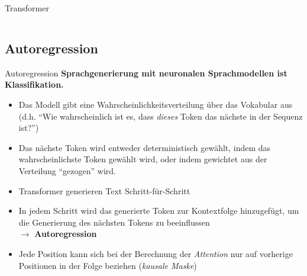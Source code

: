 \documentclass[aspectratio=169,10pt]{beamer}
\begin{document}
\begin{frame}{Transformer}
\begin{columns}[onlytextwidth,c]
    \end{columns}
\end{frame}

\subsection{Autoregression}

\begin{frame}[essential]{Autoregression}
    \small
    \textbf{Sprachgenerierung mit neuronalen Sprachmodellen ist Klassifikation.}
    \begin{itemize}
        \item Das Modell gibt eine Wahrscheinlichkeitsverteilung über das Vokabular aus (d.h. \enquote{Wie wahrscheinlich ist es, dass \emph{dieses} Token das nächste in der Sequenz ist?})
        \item Das nächste Token wird entweder deterministisch gewählt, indem das wahrscheinlichste Token gewählt wird, oder indem gewichtet aus der Verteilung \enquote{gezogen} wird.
    \end{itemize}

    \begin{definition}[Autoregression] \footnotesize
        \begin{itemize}
            \item Transformer generieren Text Schritt-für-Schritt
            \item In jedem Schritt wird das generierte Token zur Kontextfolge hinzugefügt, um die Generierung des nächsten Tokens zu beeinflussen \\
                $\rightarrow$ \textbf{Autoregression}
            \item Jede Position kann sich bei der Berechnung der \emph{Attention} nur auf vorherige Positionen in der Folge beziehen (\emph{kausale Maske})
        \end{itemize}
    \end{definition}
\end{frame}
\end{document}
